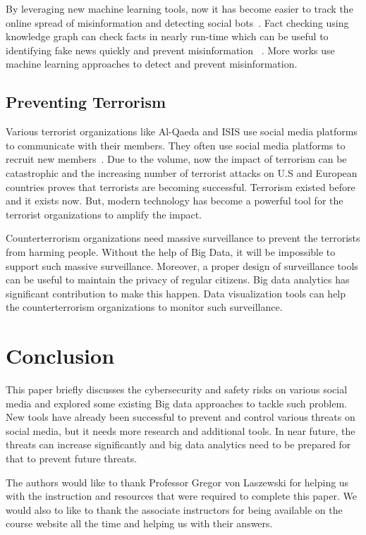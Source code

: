 \documentclass[sigconf]{acmart}
\begin{document}
By leveraging new machine learning tools, now it has become easier to track the online spread of misinformation and detecting social bots~\cite{Shao17hoaxybots, Shao15hoaxy}. Fact checking using knowledge graph can check facts in nearly run-time which can be useful to identifying fake news quickly and prevent misinformation ~\cite{Shiralkar2017Finding-Streams}. More works use machine learning approaches to detect and prevent misinformation.



\subsection{Preventing Terrorism}
Various terrorist organizations like Al-Qaeda and ISIS use social media platforms to communicate with their members. They often use social media platforms to recruit new members~\cite{terrorism}. Due to the volume, now the impact of terrorism can be catastrophic and the increasing number of terrorist attacks on U.S and European countries proves that terrorists are becoming successful. Terrorism existed before and it exists now. But, modern technology has become a powerful tool for the terrorist organizations to amplify the impact. 

Counterterrorism organizations need massive surveillance to prevent the terrorists from harming people. Without the help of Big Data, it will be impossible to support such massive surveillance. Moreover, a proper design of surveillance tools can be useful to maintain the privacy of regular citizens. Big data analytics has significant contribution to make this happen. Data visualization tools can help the counterterrorism organizations to monitor such surveillance.



\section{Conclusion}
This paper briefly discusses the cybersecurity and safety risks on various social media and explored some existing Big data approaches to tackle such problem. New tools have already been successful to prevent and control various threats on social media, but it needs more research and additional tools. In near future, the threats can increase significantly and big data analytics need to be prepared for that to prevent future threats.



\begin{acks}

The authors would like to thank Professor Gregor von Laszewski for helping us with the instruction and resources that were required to complete this paper. We would also to like to thank the associate instructors for being available on the course website all the time and helping us with their answers.

\end{acks}




 
\end{document}
